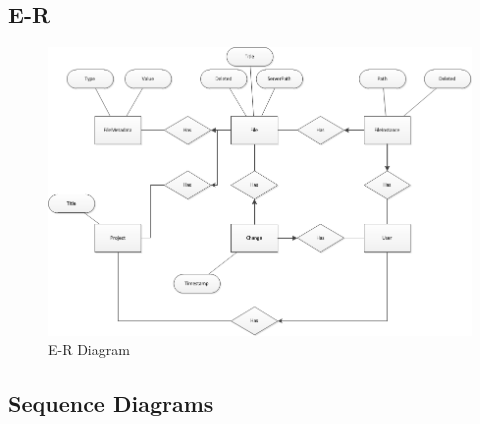 \subsection{E-R}
\begin{figure}[H]
  \includegraphics[width=\textwidth,natwidth=863,natheight=587]{illustrations/E-R.png}
  \caption{E-R Diagram}
  \label{erdiagram}
\end{figure}
\subsection{Sequence Diagrams}
